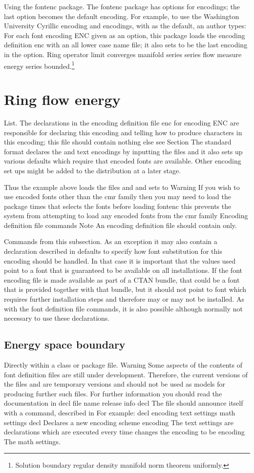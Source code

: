 \documentclass{article}
\begin{document}
Using the fontenc package. The fontenc package has options for encodings; the last option becomes the default encoding. For example, to use the Washington University Cyrillic encoding and encodings, with as the default, an author types: For each font encoding ENC given as an option, this package loads the encoding definition enc with an all lower case name file; it also sets to be the last encoding in the option.
Ring operator limit converges manifold series series flow measure energy series bounded.\footnote{Solution boundary regular density manifold norm theorem uniformly.}

\section{Ring flow energy}\label{sec18}
List. The declarations in the encoding definition file enc for encoding ENC are responsible for declaring this encoding and telling how to produce characters in this encoding; this file should contain nothing else see Section The standard format declares the and text encodings by inputting the files and it also sets up various defaults which require that encoded fonts are available. Other encoding set ups might be added to the distribution at a later stage.

Thus the example above loads the files and and sets to Warning If you wish to use encoded fonts other than the cmr family then you may need to load the package times that selects the fonts before loading fontenc this prevents the system from attempting to load any encoded fonts from the cmr family Encoding definition file commands Note An encoding definition file should contain only.

Commands from this subsection. As an exception it may also contain a declaration described in defaults to specify how font substitution for this encoding should be handled. In that case it is important that the values used point to a font that is guaranteed to be available on all installations. If the font encoding file is made available as part of a CTAN bundle, that could be a font that is provided together with that bundle, but it should not point to font which requires further installation steps and therefore may or may not be installed. As with the font definition file commands, it is also possible although normally not necessary to use these declarations.

\subsection{Energy space boundary}
Directly within a class or package file. Warning Some aspects of the contents of font definition files are still under development. Therefore, the current versions of the files and are temporary versions and should not be used as models for producing further such files. For further information you should read the documentation in decl file name release info decl The file should announce itself with a command, described in For example: decl encoding text settings math settings decl Declares a new encoding scheme encoding The text settings are declarations which are executed every time changes the encoding to be encoding The math settings.
\end{document}
